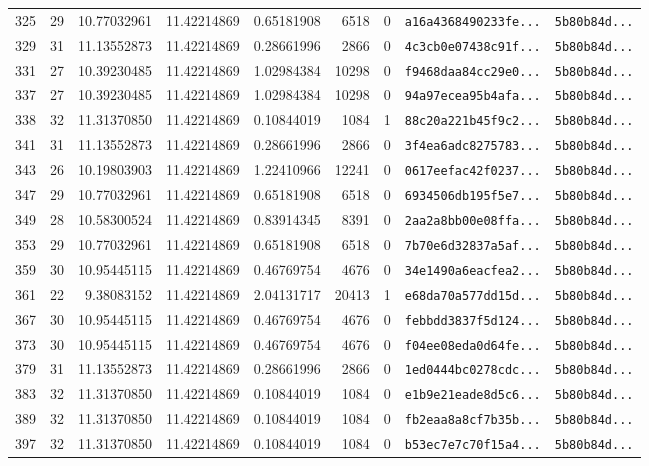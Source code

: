 \documentclass[10pt]{article}
\begin{document}
\begin{longtable}{rrrrrrrll}
  325 & 29 & 10.77032961 & 11.42214869 & 0.65181908 & 6518 & 0 & \texttt{a16a4368490233fe...} & \texttt{5b80b84d...} \\
  329 & 31 & 11.13552873 & 11.42214869 & 0.28661996 & 2866 & 0 & \texttt{4c3cb0e07438c91f...} & \texttt{5b80b84d...} \\
  331 & 27 & 10.39230485 & 11.42214869 & 1.02984384 & 10298 & 0 & \texttt{f9468daa84cc29e0...} & \texttt{5b80b84d...} \\
  337 & 27 & 10.39230485 & 11.42214869 & 1.02984384 & 10298 & 0 & \texttt{94a97ecea95b4afa...} & \texttt{5b80b84d...} \\
  \rowcolor{cmpink!20} 338 & 32 & 11.31370850 & 11.42214869 & 0.10844019 & 1084 & 1 & \texttt{88c20a221b45f9c2...} & \texttt{5b80b84d...} \\
  341 & 31 & 11.13552873 & 11.42214869 & 0.28661996 & 2866 & 0 & \texttt{3f4ea6adc8275783...} & \texttt{5b80b84d...} \\
  343 & 26 & 10.19803903 & 11.42214869 & 1.22410966 & 12241 & 0 & \texttt{0617eefac42f0237...} & \texttt{5b80b84d...} \\
  347 & 29 & 10.77032961 & 11.42214869 & 0.65181908 & 6518 & 0 & \texttt{6934506db195f5e7...} & \texttt{5b80b84d...} \\
  349 & 28 & 10.58300524 & 11.42214869 & 0.83914345 & 8391 & 0 & \texttt{2aa2a8bb00e08ffa...} & \texttt{5b80b84d...} \\
  353 & 29 & 10.77032961 & 11.42214869 & 0.65181908 & 6518 & 0 & \texttt{7b70e6d32837a5af...} & \texttt{5b80b84d...} \\
  359 & 30 & 10.95445115 & 11.42214869 & 0.46769754 & 4676 & 0 & \texttt{34e1490a6eacfea2...} & \texttt{5b80b84d...} \\
  \rowcolor{cmpink!20} 361 & 22 & 9.38083152 & 11.42214869 & 2.04131717 & 20413 & 1 & \texttt{e68da70a577dd15d...} & \texttt{5b80b84d...} \\
  367 & 30 & 10.95445115 & 11.42214869 & 0.46769754 & 4676 & 0 & \texttt{febbdd3837f5d124...} & \texttt{5b80b84d...} \\
  373 & 30 & 10.95445115 & 11.42214869 & 0.46769754 & 4676 & 0 & \texttt{f04ee08eda0d64fe...} & \texttt{5b80b84d...} \\
  379 & 31 & 11.13552873 & 11.42214869 & 0.28661996 & 2866 & 0 & \texttt{1ed0444bc0278cdc...} & \texttt{5b80b84d...} \\
  383 & 32 & 11.31370850 & 11.42214869 & 0.10844019 & 1084 & 0 & \texttt{e1b9e21eade8d5c6...} & \texttt{5b80b84d...} \\
  389 & 32 & 11.31370850 & 11.42214869 & 0.10844019 & 1084 & 0 & \texttt{fb2eaa8a8cf7b35b...} & \texttt{5b80b84d...} \\
  397 & 32 & 11.31370850 & 11.42214869 & 0.10844019 & 1084 & 0 & \texttt{b53ec7e7c70f15a4...} & \texttt{5b80b84d...} \\
\end{longtable}
\end{document}
